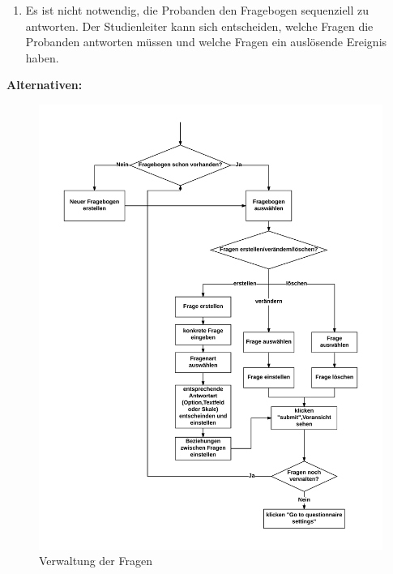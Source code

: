 \documentclass[a4paper]{scrreprt}
\begin{document}
\begin{itemize}
\begin{enumerate}
                    \item Es ist nicht notwendig, die \gls{Proband}en den Fragebogen sequenziell zu antworten. Der \gls{Studienleiter} kann sich entscheiden, welche Fragen die \gls{Proband}en antworten müssen und welche Fragen ein auslösende Ereignis haben.
                \end{enumerate}
                \par \textbf{Alternativen: }
                \begin{figure}[H]
                    \centering
                    \includegraphics[scale=0.75]{FrageVerwaltung.jpeg}
                    \caption{Verwaltung der Fragen}
                \end{figure}


\end{itemize}
\end{document}
